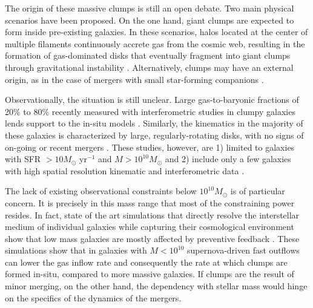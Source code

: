 The origin of these massive clumps is still an open debate. Two main physical scenarios have been proposed. On the one hand, giant clumps are expected to form inside pre-existing galaxies. In these scenarios, halos located at the center of multiple filaments continuously accrete gas from the cosmic web, resulting in the formation of gas-dominated disks that eventually fragment into giant clumps through gravitational instability \citep{Bournaud2007,Dekel2009,Behrendt2015}. Alternatively, clumps may have an external origin, as in the case of mergers with small star-forming companions \citep{Ceverino2010,Bournaud2016}. 

Observationally, the situation is still unclear. Large gas-to-baryonic fractions of 20\% to 80\% recently measured with interferometric studies in clumpy galaxies lends support to the in-situ models \citep{Erb2006,Tacconi2008,Tacconi2010}. Similarly, the kinematics in the majority of these galaxies is characterized by large, regularly-rotating disks, with no signs of on-going or recent mergers \citep{Genzel2006,ForsterSchreiber2009,Epinat2012,Newman2012}. These studies, however, are 1) limited to galaxies with SFR $>10M_{\odot}$ yr$^{-1}$ and $M>10^{10}M_{\odot}$ and 2) include only a few galaxies with high spatial resolution kinematic and interferometric data \citep{Genzel2014}. 

The lack of existing observational constraints below $10^{10}M_{\odot}$ is of particular concern. It is precisely in this mass range that most of the constraining power resides. In fact, state of the art simulations that directly resolve the interstellar medium of individual galaxies while capturing their cosmological environment show that low mass galaxies are mostly affected by preventive feedback \citep{Muratov2015, Christensen2011,Dave2016}. These simulations show that in galaxies with $M<10^{10}$ supernova-driven fast outflows can lower the gas inflow rate and consequently the rate at which clumps are formed in-situ, compared to more massive galaxies. If clumps are the result of minor merging, on the other hand, the dependency with stellar mass would hinge on the specifics of the dynamics of the mergers. 


